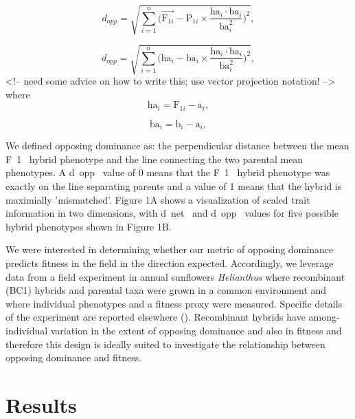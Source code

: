 \documentclass[times, twoside, watermark]{zHenriquesLab-StyleBioRxiv}
\begin{document}
\[ d_{opp} = \sqrt{\sum_{i=1}^{n}\bigg( {\vec {\textrm{F}_{1i}}} - \textrm{P}_{1i} \times \frac{ \textrm{ha}_{i} \cdot \textrm{ba}_{i}} { \textrm{ba}_{i}^2}\bigg)^2 }, \]

\[ d_{opp} = \sqrt{\sum_{i=1}^{n}\bigg( \textrm{ha}_{i} - \textrm{ba}_{i} \times \frac{ \textrm{ha}_{i} \cdot \textrm{ba}_{i}} { \textrm{ba}_{i}^2}\bigg)^2 }, \]
<!-- need some advice on how to write this; use vector projection notation! -->
\noindent
where \[ \textrm{ha}_{i} = \textrm{F}_{1i} - \textrm{a}_{i}, \]

\[ \textrm{ba}_{i} = \textrm{b}_{i} - \textrm{a}_{i}, \]
\noindent

We defined opposing dominance as: the perpendicular distance between the mean F~1~ hybrid phenotype and the line connecting the two parental mean phenotypes. A d~opp~ value of 0 means that the F~1~ hybrid phenotype was exactly on the line separating parents and a value of 1 means that the hybrid is maximially 'mismatched'. Figure 1A shows a visualization of scaled trait information in two dimensions, with d~net~ and d~opp~ values for five possible hybrid phenotypes shown in Figure 1B.\par

We were interested in determining whether our metric of opposing dominance predicts fitness in the field in the direction expected. Accordingly, we leverage data from a field experiment in annual sunflowers \textit{Helianthus} where recombinant (BC1) hybrids and parental taxa were grown in a common environment and where individual phenotypes and a fitness proxy were measured. Specific details of the experiment are reported elsewhere (\citealt{Whitney2006}). Recombinant hybrids have among-individual variation in the extent of opposing dominance and also in fitness and therefore this design is ideally suited to investigate the relationship between opposing dominance and fitness.\par


\section*{Results}
\end{document}
